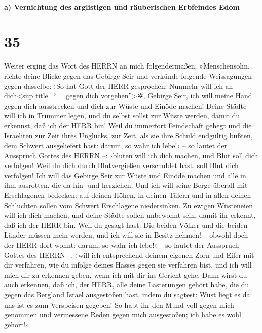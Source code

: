 \hypertarget{a-vernichtung-des-arglistigen-und-ruxe4uberischen-erbfeindes-edom}{%
\paragraph{a) Vernichtung des arglistigen und räuberischen Erbfeindes
Edom}\label{a-vernichtung-des-arglistigen-und-ruxe4uberischen-erbfeindes-edom}}

\hypertarget{section-34}{%
\section{35}\label{section-34}}

Weiter erging das Wort des HERRN an mich folgendermaßen:
»Menschensohn, richte deine Blicke gegen das Gebirge Seir
und verkünde folgende Weissagungen gegen dasselbe: ›So hat
Gott der HERR gesprochen: Nunmehr will ich an dich\textless sup
title=``=~gegen dich vorgehen''\textgreater✲, Gebirge Seir, ich will
meine Hand gegen dich ausstrecken und dich zur Wüste und Einöde machen!
Deine Städte will ich in Trümmer legen, und du selbst
sollst zur Wüste werden, damit du erkennst, daß ich der HERR bin!
Weil du immerfort Feindschaft gehegt und die Israeliten
zur Zeit ihres Unglücks, zur Zeit, als sie ihre Schuld endgültig büßten,
dem Schwert ausgeliefert hast: darum, so wahr ich lebe!‹
-- so lautet der Ausspruch Gottes des HERRN --: ›bluten will ich dich
machen, und Blut soll dich verfolgen! Weil du dich durch Blutvergießen
verschuldet hast, soll Blut dich verfolgen! Ich will das
Gebirge Seir zur Wüste und Einöde machen und alle in ihm ausrotten, die
da hin- und herziehen. Und ich will seine Berge überall
mit Erschlagenen bedecken: auf deinen Höhen, in deinen Tälern und in
allen deinen Schluchten sollen vom Schwert Erschlagene niedersinken.
Zu ewigen Wüsteneien will ich dich machen, und deine
Städte sollen unbewohnt sein, damit ihr erkennt, daß ich der HERR bin.
Weil du gesagt hast: Die beiden Völker und die beiden
Länder müssen mein werden, und ich will sie in Besitz nehmen! -- obwohl
doch der HERR dort wohnt: darum, so wahr ich lebe!‹ -- so
lautet der Ausspruch Gottes des HERRN --, ›will ich entsprechend deinem
eigenen Zorn und Eifer mit dir verfahren, wie du infolge deines Hasses
gegen sie verfahren bist, und ich will mich dir zu erkennen geben, wenn
ich mit dir ins Gericht gehe. Dann wirst du auch
erkennen, daß ich, der HERR, alle deine Lästerungen gehört habe, die du
gegen das Bergland Israel ausgestoßen hast, indem du sagtest: Wüst liegt
es da: uns ist es zum Verspeisen gegeben! So habt ihr den
Mund voll gegen mich genommen und vermessene Reden gegen mich
ausgestoßen; ich habe es wohl gehört!‹

